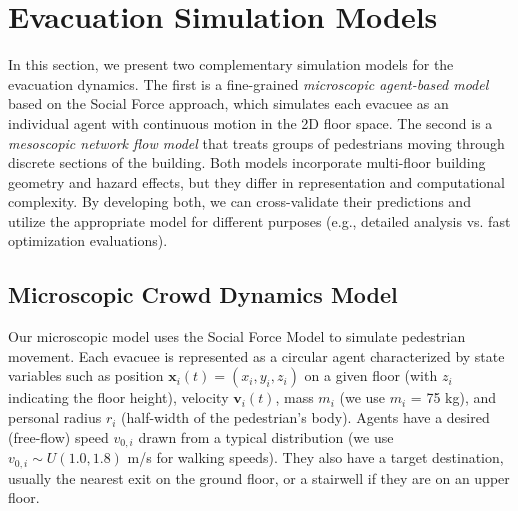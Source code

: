 \documentclass[11pt,a4paper]{article}
\begin{document}
\section{Evacuation Simulation Models}
In this section, we present two complementary simulation models for the evacuation dynamics. The first is a fine-grained \textit{microscopic agent-based model} based on the Social Force approach, which simulates each evacuee as an individual agent with continuous motion in the 2D floor space. The second is a \textit{mesoscopic network flow model} that treats groups of pedestrians moving through discrete sections of the building. Both models incorporate multi-floor building geometry and hazard effects, but they differ in representation and computational complexity. By developing both, we can cross-validate their predictions and utilize the appropriate model for different purposes (e.g., detailed analysis vs. fast optimization evaluations).

\subsection{Microscopic Crowd Dynamics Model}
Our microscopic model uses the Social Force Model \cite{helbing1995, helbing2000} to simulate pedestrian movement. Each evacuee is represented as a circular agent characterized by state variables such as position $\mathbf{x}_i(t) = (x_i, y_i, z_i)$ on a given floor (with $z_i$ indicating the floor height), velocity $\mathbf{v}_i(t)$, mass $m_i$ (we use $m_i$ = 75 kg), and personal radius $r_i$ (half-width of the pedestrian's body). Agents have a desired (free-flow) speed $v_{0,i}$ drawn from a typical distribution (we use $v_{0,i}\sim U(1.0, 1.8)$ m/s for walking speeds). They also have a target destination, usually the nearest exit on the ground floor, or a stairwell if they are on an upper floor.
\end{document}
